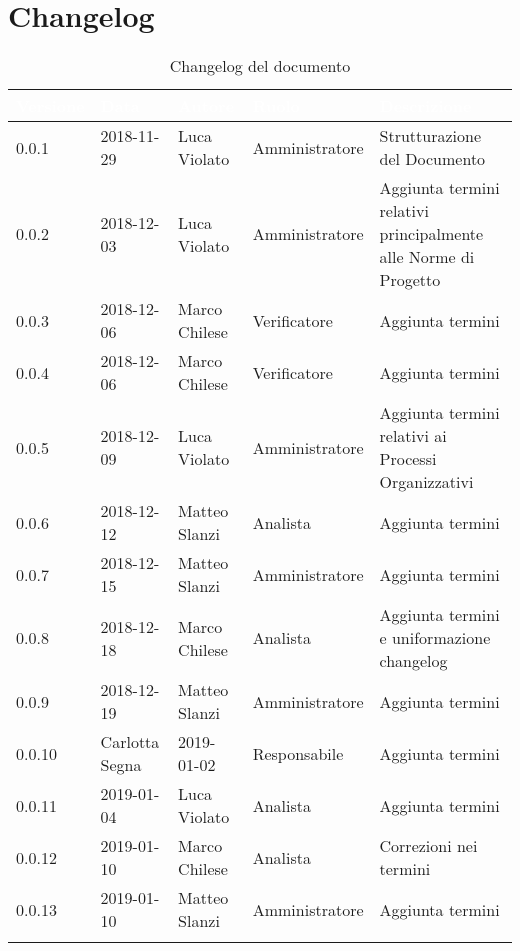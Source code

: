 \section*{Changelog}

\begin{center}
\begin{longtable}[c]{|m{}|m{}|m{}|m{}|p{}|}
\hline
\rowcolor{bluelogo}\textbf{\textcolor{white}{Versione}} & \textbf{\textcolor{white}{Data}} & \textbf{\textcolor{white}{Autore}} & \textbf{\textcolor{white}{Ruolo}} & \textbf{\textcolor{white}{Descrizione}} \\
\hline \hline
\endfirsthead
0.0.1 & 2018-11-29 & Luca Violato & Amministratore & Strutturazione del Documento \\
\hline
\rowcolor{grigio}0.0.2 & 2018-12-03 & Luca Violato & Amministratore & Aggiunta termini relativi principalmente alle Norme di Progetto \\
\hline
0.0.3 & 2018-12-06 & Marco Chilese & Verificatore & Aggiunta termini\\
\hline 
\rowcolor{grigio}0.0.4 & 2018-12-06 & Marco Chilese & Verificatore & Aggiunta termini\\
\hline
0.0.5 & 2018-12-09 & Luca Violato & Amministratore & Aggiunta termini relativi ai Processi Organizzativi\\
\hline
\rowcolor{grigio}0.0.6 & 2018-12-12 & Matteo Slanzi & Analista & Aggiunta termini\\
\hline
0.0.7 & 2018-12-15 & Matteo Slanzi & Amministratore & Aggiunta termini\\
\hline
\rowcolor{grigio}0.0.8 & 2018-12-18 & Marco Chilese & Analista & Aggiunta termini e uniformazione changelog\\
\hline
0.0.9 & 2018-12-19 & Matteo Slanzi & Amministratore & Aggiunta termini\\
\hline
\rowcolor{grigio} 0.0.10 & Carlotta Segna & 2019-01-02 & Responsabile & Aggiunta termini\\
\hline
0.0.11 & 2019-01-04 & Luca Violato & Analista & Aggiunta termini\\
\hline
\rowcolor{grigio}0.0.12 & 2019-01-10 & Marco Chilese & Analista & Correzioni nei termini\\
\hline
0.0.13 & 2019-01-10 & Matteo Slanzi & Amministratore & Aggiunta termini\\
\hline
\caption{Changelog del documento}
\end{longtable}
\end{center}
